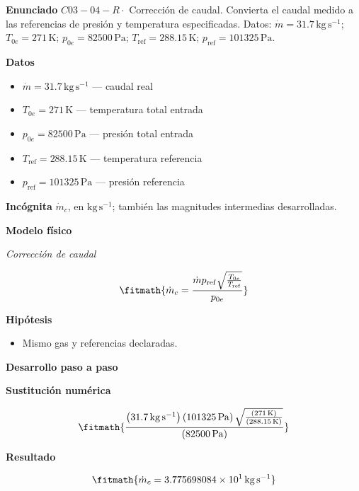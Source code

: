\documentclass[10pt,openany]{book}
\begin{document}
\begin{tcolorbox}[title={Problema resuelto 4}, studiumworked, breakable]

\noindent\textbf{Enunciado}
\(C03-04-R \cdot\) Corrección de caudal. Convierta el caudal medido a las referencias de presión y temperatura especificadas. Datos: \(\dot m=31.7\, \mathrm{kg}\,\mathrm{s}^{-1}\); \(T_{0e}=271\, \mathrm{K}\); \(p_{0e}=82500\, \mathrm{Pa}\); \(T_{\mathrm{ref}}=288.15\, \mathrm{K}\); \(p_{\mathrm{ref}}=101325\, \mathrm{Pa}\).

\noindent\textbf{Datos}
\begin{itemize}
\item $\dot m = 31.7\,\mathrm{kg}\,\mathrm{s}^{-1}$ — caudal real
\item $T_{0e} = 271\,\mathrm{K}$ — temperatura total entrada
\item $p_{0e} = 82500\,\mathrm{Pa}$ — presión total entrada
\item $T_{\mathrm{ref}} = 288.15\,\mathrm{K}$ — temperatura referencia
\item $p_{\mathrm{ref}} = 101325\,\mathrm{Pa}$ — presión referencia
\end{itemize}

\noindent\textbf{Incógnita}
$\dot{m}_c$, en $\mathrm{kg\,s^{-1}}$; también las magnitudes intermedias desarrolladas.

\noindent\textbf{Modelo físico}

\noindent\textit{Corrección de caudal}

\[
\fitmath{\dot{m}_c=\frac{\dot m p_{\mathrm{ref}} \sqrt{\frac{T_{0e}}{T_{\mathrm{ref}}}}}{p_{0e}}}
\]

\noindent\textbf{Hipótesis}
\begin{itemize}
\item Mismo gas y referencias declaradas.
\end{itemize}

\noindent\textbf{Desarrollo paso a paso}



\noindent\textbf{Sustitución numérica}

\[
\fitmath{\frac{\left(31.7\,\mathrm{kg}\,\mathrm{s}^{-1}\right) \left(101325\,\mathrm{Pa}\right) \sqrt{\frac{\left(271\,\mathrm{K}\right)}{\left(288.15\,\mathrm{K}\right)}}}{\left(82500\,\mathrm{Pa}\right)}}
\]

\noindent\textbf{Resultado}

\[
\fitmath{\dot{m}_c=3.775698084\times10^{1}\,\mathrm{kg}\,\mathrm{s}^{-1}}
\]


\end{tcolorbox}
\end{document}
